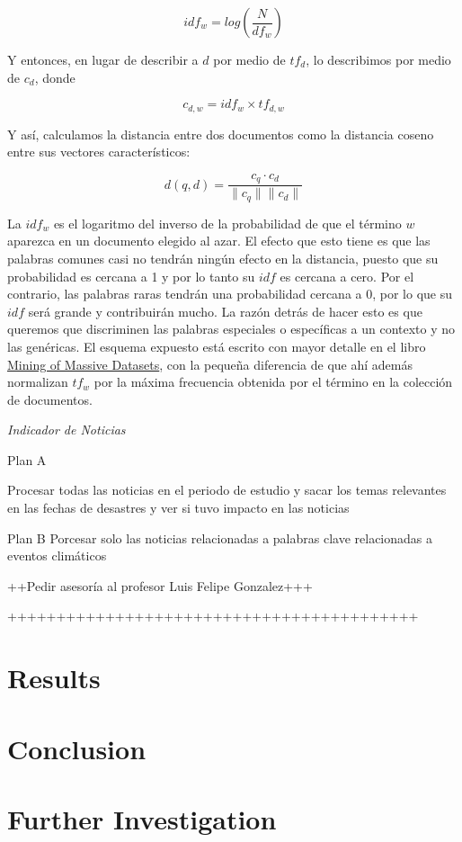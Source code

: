 \documentclass[]{article}
\begin{document}
\[
idf_w = log(\frac{N}{df_w}) 
\]

Y entonces, en lugar de describir a $d$ por medio de $tf_d$, lo
describimos por medio de $c_d$, donde

\[
c_{d,w} = idf_w \times tf_{d,w}
\]

Y así, calculamos la distancia entre dos documentos como la distancia
coseno entre sus vectores característicos:

\[
d(q,d) = \frac{c_q \cdot c_d}{\|c_q\| \|c_d\|}
\]

La $idf_w$ es el logaritmo del inverso de la probabilidad de que el
término $w$ aparezca en un documento elegido al azar. El efecto que esto
tiene es que las palabras comunes casi no tendrán ningún efecto en la
distancia, puesto que su probabilidad es cercana a 1 y por lo tanto su
$idf$ es cercana a cero. Por el contrario, las palabras raras tendrán
una probabilidad cercana a 0, por lo que su $idf$ será grande y
contribuirán mucho. La razón detrás de hacer esto es que queremos que
discriminen las palabras especiales o específicas a un contexto y no las
genéricas. El esquema expuesto está escrito con mayor detalle en el
libro \href{http://www.mmds.org}{Mining of Massive Datasets}, con la
pequeña diferencia de que ahí además normalizan $tf_w$ por la máxima
frecuencia obtenida por el término en la colección de documentos.

\emph{Indicador de Noticias}

Plan A

Procesar todas las noticias en el periodo de estudio y sacar los temas
relevantes en las fechas de desastres y ver si tuvo impacto en las
noticias

Plan B Porcesar solo las noticias relacionadas a palabras clave
relacionadas a eventos climáticos

++Pedir asesoría al profesor Luis Felipe Gonzalez+++

++++++++++++++++++++++++++++++++++++++++++

\section{Results}\label{results}

\section{Conclusion}\label{conclusion}

\section{Further Investigation}\label{further-investigation}
\end{document}
